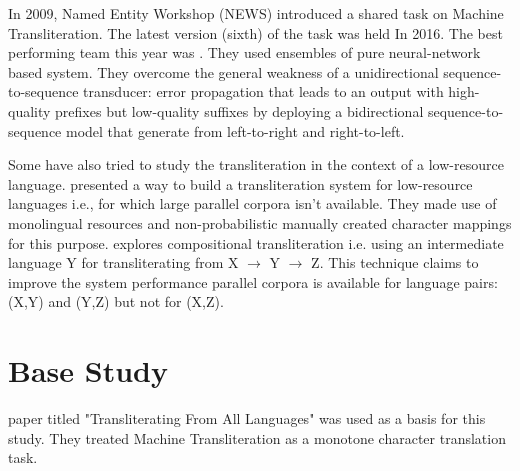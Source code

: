 \documentclass[11pt,a4paper]{article}
\begin{document}
In 2009, Named Entity Workshop (NEWS) introduced a shared task on Machine Transliteration. The latest version (sixth) of the task was held In 2016. The best performing team this year was \citet*{finch-news-2016-1}. They used ensembles of pure neural-network based system. They overcome the general weakness of a unidirectional sequence-to-sequence transducer: error propagation that leads to an output with high-quality prefixes but low-quality suffixes by deploying a bidirectional sequence-to-sequence model that generate from left-to-right and right-to-left. 
\par
Some have also tried to study the transliteration in the context of a low-resource language. \citet*{chinnakotla-1} presented a way to build a transliteration system for low-resource languages i.e., for which large parallel corpora isn't available. They made use of monolingual resources and non-probabilistic manually created character mappings for this purpose. \citet*{kumaran-2} explores compositional transliteration i.e. using an intermediate language Y for transliterating from X $\to$ Y $\to$ Z. This technique claims to improve the system performance parallel corpora is available for language pairs: (X,Y) and (Y,Z) but not for (X,Z).

\section{Base Study}
\citet*{burch-1} paper titled "Transliterating From All Languages" was used as a basis for this study. They treated Machine Transliteration as a monotone character translation task.
\end{document}
